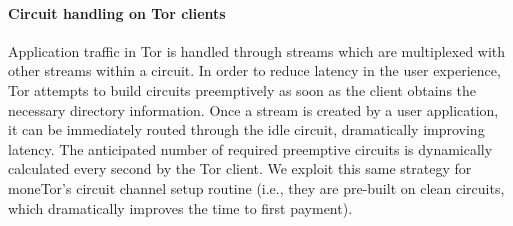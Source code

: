 \paragraph*{Circuit handling on Tor clients}
%

Application traffic in Tor is handled through streams
which are multiplexed with other streams within a circuit. In order to reduce
latency in the user experience, Tor attempts to build circuits preemptively as
soon as the client obtains the necessary directory information. Once a stream is
created by a user application, it can be immediately routed through the idle
circuit, dramatically improving latency. The anticipated number of required
preemptive circuits is dynamically calculated every second by the Tor client. We
exploit this same strategy for moneTor's circuit channel setup routine (i.e., they are pre-built on clean circuits, which dramatically improves the time to first payment).



